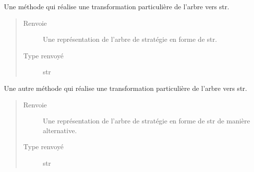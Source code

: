 \documentclass[letterpaper,10pt,french]{sphinxmanual}
\begin{document}
\begin{fulllineitems}
\begin{fulllineitems}
\begin{quote}
\begin{description}
\end{description}\end{quote}

\end{fulllineitems}


\begin{fulllineitems}
\label{\detokenize{index:StrategyTree.StrategyTree.str_alt}}
Une méthode qui réalise une transformation particulière de l’arbre vers str.
\begin{quote}\begin{description}
\item[{Renvoie}] \leavevmode
{} \textendash{} Une représentation de l’arbre de stratégie en forme de str.

\item[{Type renvoyé}] \leavevmode
str

\end{description}\end{quote}

\end{fulllineitems}


\begin{fulllineitems}
\label{\detokenize{index:StrategyTree.StrategyTree.str_alt_2}}
Une autre méthode qui réalise une transformation particulière de l’arbre vers str.
\begin{quote}\begin{description}
\item[{Renvoie}] \leavevmode
{} \textendash{} Une représentation de l’arbre de stratégie en forme de str de manière alternative.

\item[{Type renvoyé}] \leavevmode
str

\end{description}\end{quote}

\end{fulllineitems}



\end{fulllineitems}
\end{document}
